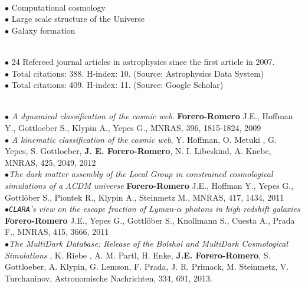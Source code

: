 \documentclass[10pt]{article}
\begin{document}
\\
\noindent\makebox[\linewidth]{\rule{\textwidth}{0.4pt}}%

\noindent$\bullet$ Computational cosmology\\

\noindent$\bullet$ Large scale structure of the Universe\\

\noindent$\bullet$ Galaxy formation\\



\\
\noindent\makebox[\linewidth]{\rule{\textwidth}{0.4pt}}%

\noindent$\bullet$ 24 Refereed journal articles in astrophysics since the first article in 2007.\\

\noindent$\bullet$ Total citations: 388. H-index: 10. (Source: Astrophysics Data System)\\

\noindent$\bullet$ Total citations: 409. H-index: 11. (Source: Google Scholar)\\


\\
\noindent\makebox[\linewidth]{\rule{\textwidth}{0.4pt}}%

\noindent$\bullet$ {\it A dynamical classification of the  cosmic web}.  {\bf Forero-Romero} J.E., Hoffman Y.,  Gottloeber S., Klypin A., Yepes G.,
MNRAS, 396, 1815-1824, 2009\\

\noindent$\bullet$ {\it A kinematic classification of the cosmic web},
  Y. Hoffman, O. Metuki , G. Yepes, S. Gottloeber, {\bf
    J. E. Forero-Romero}, N. I. Libeskind, A. Knebe, MNRAS, 425, 2049,
  2012 \\

\noindent$\bullet${\it The dark matter assembly of the Local Group in constrained cosmological   simulations of a $\Lambda$CDM universe} {\bf Forero-Romero} J.E.,  Hoffman Y., Yepes G., Gottl\"ober S., Piontek R., Klypin A., Steinmetz
M.,  MNRAS, 417, 1434, 2011 \\

\noindent$\bullet${\it {\tt CLARA}'s view on the escape fraction of Lyman-$\alpha$ photons in   high redshift galaxies} {\bf Forero-Romero} J.E., Yepes G., Gottl\"ober S., Knollmann S., Cuesta A., Prada F.,   MNRAS, 415, 3666, 2011\\

\noindent$\bullet${\it The MultiDark Database: Release of the Bolshoi and
  MultiDark Cosmological Simulations} , K. Riebe , A. M. Partl,
  H. Enke, {\bf J.E. Forero-Romero}, S. Gottloeber, A. Klypin,
  G. Lemson, F. Prada, J. R. Primack, M. Steinmetz, V. Turchaninov,
  Astronomische Nachrichten, 334, 691, 2013. \\
\end{document}
